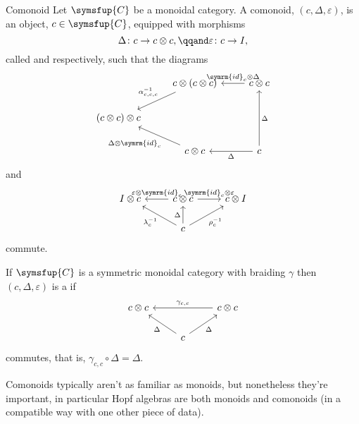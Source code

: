 \documentclass[fleqn]{NotesClass}
\newcommand{\cat}[1]{\symsfup{#1}}
\newcommand{\id}{\symrm{id}}
\begin{document}
    \begin{dfn}{Comonoid}{}
        Let \(\cat{C}\) be a monoidal category.
        A comonoid, \((c, \Delta, \varepsilon)\), is an object, \(c \in \cat{C}\), equipped with morphisms
        \begin{equation}
            \Delta \colon c \to c \otimes c, \qqand \varepsilon \colon c \to I,
        \end{equation}
        called  and  respectively, such that the diagrams
        \begin{equation}
            \begin{tikzcd}
                & c \otimes (c \otimes c) \arrow[dl, "{\alpha_{c,c,c}^{-1}}"', pos=0.4] &  c \otimes c \arrow[l, "\id_c \otimes \Delta"']\\
                (c \otimes c) \otimes c\\
                & c \otimes c \arrow[ul, "\Delta \otimes \id_c", pos=0.4] & c \arrow[l, "\Delta"] \arrow[uu, "\Delta"']
            \end{tikzcd}
        \end{equation}
        and
        \begin{equation}
            \begin{tikzcd}
                I \otimes c & c \otimes c \arrow[l, "\varepsilon \otimes \id_c"'] \arrow[r, "\id_c \otimes \varepsilon"] & c \otimes I\\
                & c \arrow[ul, "\lambda_c^{-1}"] \arrow[ur, "\rho_c^{-1}"'] \arrow[u, "\Delta"] &
            \end{tikzcd}
        \end{equation}
        commute.
        
        If \(\cat{C}\) is a symmetric monoidal category with braiding \(\gamma\) then \((c, \Delta, \varepsilon)\) is a  if
        \begin{equation}
            \begin{tikzcd}
                c \otimes c && c \otimes c \arrow[ll, "{\gamma_{c,c}}"']\\
                & c \arrow[ul, "\Delta"] \arrow[ur, "\Delta"']
            \end{tikzcd}
        \end{equation}
        commutes, that is, \(\gamma_{c,c} \circ \Delta = \Delta\).
    \end{dfn}
    
    Comonoids typically aren't as familiar as monoids, but nonetheless they're important, in particular Hopf algebras are both monoids and comonoids (in a compatible way with one other piece of data).
    
\end{document}
